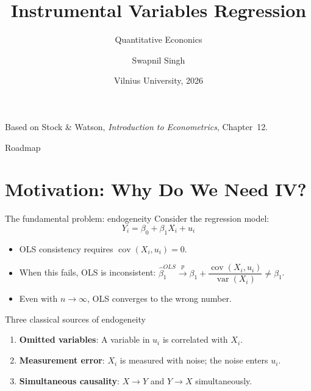 \documentclass[10pt]{beamer}
\title{Instrumental Variables Regression}
\subtitle{Quantitative Econonics }
\author{Swapnil Singh}
\institute{Lietuvos Bankas \and Kaunas University of Technology}
\date{Vilnius University, 2026}
\begin{document}
\begin{frame}[plain]
  \titlepage
  \vfill
  {\scriptsize\color{gray} Based on Stock \& Watson, \emph{Introduction to Econometrics}, Chapter~12.}
\end{frame}

\begin{frame}{Roadmap}
\tableofcontents
\end{frame}

\section{Motivation: Why Do We Need IV?}

\begin{frame}{The fundamental problem: endogeneity}
\label{slide:endogeneity}
Consider the regression model:
\[
Y_i = \beta_0 + \beta_1 X_i + u_i
\]

\begin{itemize}
  \item OLS consistency requires $\operatorname{cov}(X_i, u_i) = 0$.
  \item When this fails, OLS is \alert{inconsistent}: $\widehat{\beta}_1^{OLS} \xrightarrow{p} \beta_1 + \dfrac{\operatorname{cov}(X_i, u_i)}{\operatorname{var}(X_i)} \neq \beta_1$.
  \item Even with $n \to \infty$, OLS converges to the wrong number.
\end{itemize}

\pause
\begin{alertblock}{Three classical sources of endogeneity}
\begin{enumerate}
  \item \textbf{Omitted variables}: A variable in $u_i$ is correlated with $X_i$.
  \item \textbf{Measurement error}: $X_i$ is measured with noise; the noise enters $u_i$.
  \item \textbf{Simultaneous causality}: $X \to Y$ and $Y \to X$ simultaneously.
\end{enumerate}
\end{alertblock}
\end{frame}
\end{document}
